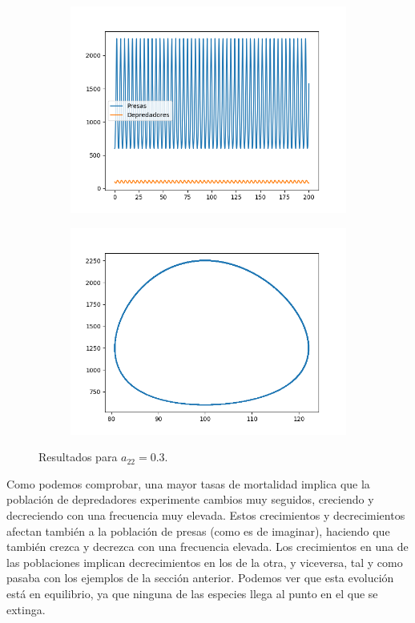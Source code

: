 \documentclass[11pt,a4paper]{article}
\begin{document}
\begin{figure}[H]
\centering
\begin{subfigure}{.5\textwidth}
	\centering
	\includegraphics[scale=0.45]{img/a22}
\end{subfigure}%
\begin{subfigure}{.5\textwidth}
	\centering
	\includegraphics[scale=0.45]{img/circulo-a22}
\end{subfigure}
\caption{Resultados para $a_{22} = 0.3$.}
\label{fig:a22}
\end{figure}

Como podemos comprobar, una mayor tasas de mortalidad implica que la población de depredadores
experimente cambios muy seguidos, creciendo y decreciendo con una frecuencia muy elevada. Estos
crecimientos y decrecimientos afectan también a la población de presas (como es de imaginar), haciendo
que también crezca y decrezca con una frecuencia elevada. Los crecimientos en una de las poblaciones
implican decrecimientos en los de la otra, y viceversa, tal y como pasaba con los ejemplos de la
sección anterior. Podemos ver que esta evolución está en equilibrio, ya que ninguna de las especies llega
al punto en el que se extinga.
\end{document}

